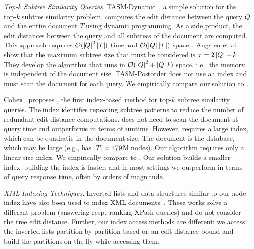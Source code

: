 
\emph{Top-$k$ Subtree Similarity Queries.} TASM-Dynamic~\cite{zhang-siam-1989,augsten-icde-2010}, a simple solution for the top-$k$ subtree similarity problem, computes the edit distance between the query $Q$ and the entire document $T$ using dynamic programming. As a side product, the edit distances between the query and all subtrees of the document are computed. This approach requires $\mathcal{O} ( \left| Q \right|^2\left| T \right| )$ time and $\mathcal{O} ( \left| Q \right|\left| T \right| )$ space~\cite{demaine-talg-2009}.
%
Augsten et al.~\cite{augsten-icde-2010, augsten-tkde-2011} show that the maximum subtree size that must be considered is $\tau = 2\left| Q \right| + k$. They develop the \tasmpostorder{} algorithm that runs in $\mathcal{O} ( \left| Q \right|^2 + \left| Q \right|k )$ space, i.e., the memory is independent of the document size. TASM-Postorder does not use an index and must scan the document for each query. We empirically compare our solution to \tasmpostorder{}.

Cohen~\cite{cohen-sigmod-2013} proposes \structuresearch{}, the first index-based method for top-$k$ subtree similarity queries. The index identifies repeating subtree patterns to reduce the number of redundant edit distance computations. \structuresearch{} does not need to scan the document at query time and outperforms \tasmpostorder{} in terms of runtime. However, \structuresearch{} requires a large index, which can be quadratic in the document size. The document is the database, which may be large (e.g., \swissprot{} has $\left| T \right| = 479$M nodes). Our \shincone{} algorithm requires only a linear-size index.
%
We empirically compare \structuresearch{} to \shincone{}. Our solution builds a smaller index,  building the index is faster, and in most settings we outperform \structuresearch{} in terms of query response time, often by orders of magnitude.

\emph{XML Indexing Techniques.} Inverted lists and data structures similar to our node index have also been used to index XML documents~\cite{grust-sigmod-2002, kaushik-sigmod-2004}. These works solve a different problem (answering resp.\ ranking XPath queries) and do not consider the tree edit distance. Further, our index access methods are different: we access the inverted lists partition by partition based on an edit distance bound and build the partitions on the fly while accessing them.

